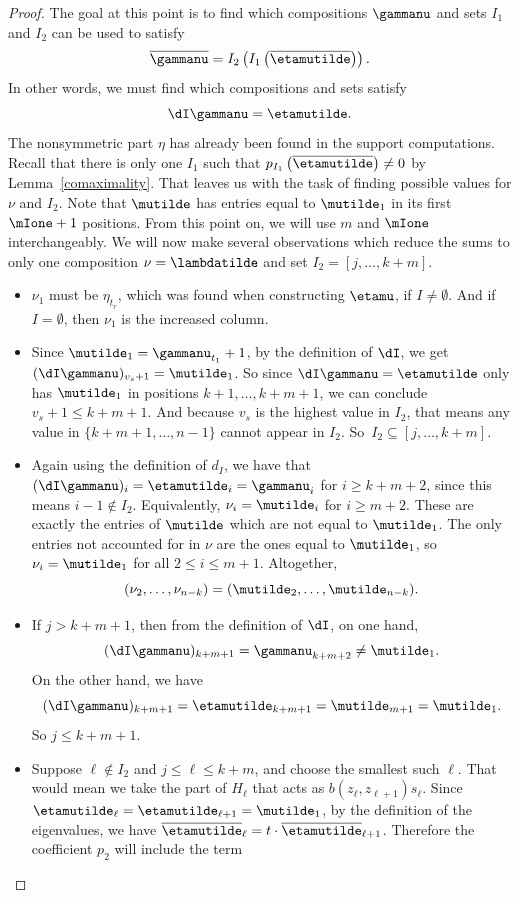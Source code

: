 \begin{proof}
The goal at this point is to find which compositions $\gammanu$ and sets $I_1$ and $I_2$ can be used to satisfy
\[\overline{\gammanu} = I_2\left(I_1\left(\overline{\etamutilde}\right)\right). \]
In other words, we must find which compositions and sets satisfy
\[\dI\gammanu = \etamutilde. \]
The nonsymmetric part $\eta$ has already been found in the support computations. Recall that there is only one $I_1$ such that $p_{I_1}\left(\overline{\etamutilde}\right) \neq 0$ by Lemma~\ref{comaximality}. That leaves us with the task of finding possible values for $\nu$ and $I_2$.
 Note that $\mutilde$ has entries equal to $\mutilde_1$ in its first $\mIone+1$ positions. From this point on, we will use $m$ and $\mIone$ interchangeably. We will now make several observations which reduce the sums to only one composition $\nu=\lambdatilde$ and set $I_2=[j, \dotsc,k+m]$. 
\begin{itemize}
    \item $\nu_1$ must be $\eta_{t_r}$, which was found when constructing $\etamu$, if $I \neq \emptyset$. And if $I=\emptyset$, then $\nu_1$ is the increased column.
    \item Since $\mutilde_1 = \gammanu_{t_1}+1$, by the definition of $\dI$, we get $(\dI \gammanu)_{v_s+1} = \mutilde_1$. So since $\dI \gammanu = \etamutilde$ only has $\mutilde_1$ in positions $k+1, \dots, k+m+ 1$, we can conclude $v_s+1 \leq k+ m + 1$. And because $v_s$ is the highest value in $I_2$, that means any value in $\{k+m+1, \dotsc, n-1\}$ cannot appear in $I_2$. So~$I_2 \subseteq [j, \dotsc, k+m]$.
    \item Again using the definition of $d_I$, we have that $(\dI \gammanu)_i = \etamutilde_i = \gammanu_i$ for $i\geq k+m+2$, since this means $i-1 \notin I_2$. Equivalently, $\nu_i = \mutilde_i$ for $i\geq m+2$. These are exactly the entries of $\mutilde$ which are not equal to $\mutilde_1$. The only entries not accounted for in $\nu$ are the ones equal to $\mutilde_1$, so $\nu_i = \mutilde_1$ for all $2\leq i \leq m + 1$.  Altogether,
    \[ (\nu_2, \dotsc, \nu_{n-k}) = (\mutilde_2, \dotsc, \mutilde_{n-k}).\]
    \item If $j>k+m + 1$, then from the definition of $\dI$, on one hand, \[(\dI \gammanu)_{k+m+1}=\gammanu_{k+m+2} \neq \mutilde_1.\]
    On the other hand, we have
    \[ (\dI \gammanu)_{k+m+1} = \etamutilde_{k+m + 1} = \mutilde_{m+1} = \mutilde_1.\]
    So $j\leq k+m+1$.
    \item Suppose $\ell \notin I_2$ and $j \leq \ell \leq k+m$, and choose the smallest such $\ell$. That would mean we take the part of $H_\ell$ that acts as $b(z_\ell, z_{\ell+1}) s_\ell$. Since $\etamutilde_\ell = \etamutilde_{\ell+1}=\mutilde_1$, by the definition of the eigenvalues, we have $\overline{\etamutilde}_\ell = t\cdot \overline{\etamutilde}_{\ell+1}$. Therefore the coefficient $p_2$ will include the term 

\end{itemize}
\end{proof}
